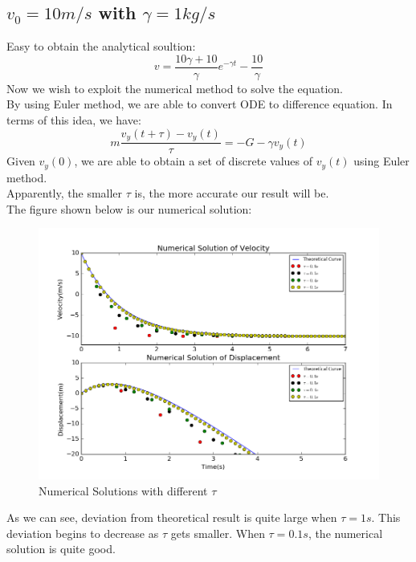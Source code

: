 \documentclass[10pt,a4paper]{article}
\begin{document}
	\subsection{$v_0=10m/s$ with $\gamma=1kg /s$}
	Easy to obtain the analytical soultion:
	\begin{equation}
	v=\frac{10\gamma+10}{\gamma} e^{-\gamma t}-\frac{10}{\gamma}
	\end{equation}
	Now we wish to exploit the numerical method to solve the equation.\\
	By using Euler method, we are able to convert ODE to difference equation. In terms of this idea, we have:
	\begin{equation}
	m\frac{v_y(t+\tau)-v_y(t)}{\tau}=-G-\gamma v_y(t)
	\end{equation}
	Given $v_y(0)$, we are able to obtain a set of discrete values of $v_y(t)$ using Euler method.\\
	Apparently, the smaller $\tau$ is, the more accurate our result will be.\\
	The figure shown below is our numerical solution:\\
	\begin{figure}[htbp]
		    \centering
			\includegraphics[width=5in]{Solution.png}
			\caption{Numerical Solutions with different $\tau$}
	\end{figure}
    As we can see, deviation from theoretical result is quite large when $\tau=1s$. This deviation begins to decrease as $\tau$ gets smaller. When $\tau=0.1s$, the numerical solution is quite good.
	
\end{document}
